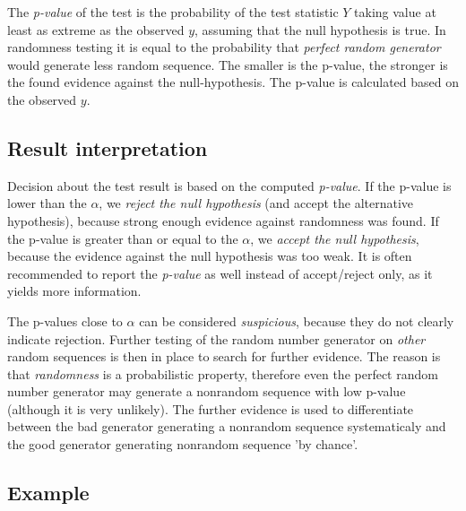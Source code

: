 \documentclass[
  digital,     %
  oneside,     %
  nosansbold,  %
  nocolorbold, %
  nolof,         %
  nolot,         %
]{fithesis4}
\begin{document}

The \emph{p-value} of the test is the probability of the test statistic $Y$ taking value at least as extreme as the observed $y$, assuming that the null hypothesis is true. In randomness testing it is equal to the probability that \emph{perfect random generator} would generate less random sequence. The smaller is the p-value, the stronger is the found evidence against the null-hypothesis. \cite[p. 386]{basic_practice} The p-value is calculated based on the observed $y$.



\subsection{Result interpretation}

Decision about the test result is based on the computed \emph{p-value}. If the p-value is lower than the $\alpha$, we \emph{reject the null hypothesis} (and accept the alternative hypothesis), because strong enough evidence against randomness was found. If the p-value is greater than or equal to the $\alpha$, we \emph{accept the null hypothesis}, because the evidence against the null hypothesis was too weak. \cite[p. 390]{basic_practice} It is often recommended to report the \emph{p-value} as well instead of accept/reject only, as it yields more information. \cite[p. 90]{tu01_guide}


The p-values close to $\alpha$ can be considered \emph{suspicious}, because they do not clearly indicate rejection. Further testing of the random number generator on \emph{other} random sequences is then in place to search for further evidence. \cite[p. 5]{tu01_paper} The reason is that \emph{randomness} is a probabilistic property, therefore even the perfect random number generator may generate a nonrandom sequence with low p-value (although it is very unlikely). The further evidence is used to differentiate between the bad generator generating a nonrandom sequence systematicaly and the good generator generating nonrandom sequence 'by chance'. \cite[p. 90]{tu01_guide}




\subsection{Example} \label{chap:rand-example}
\end{document}
